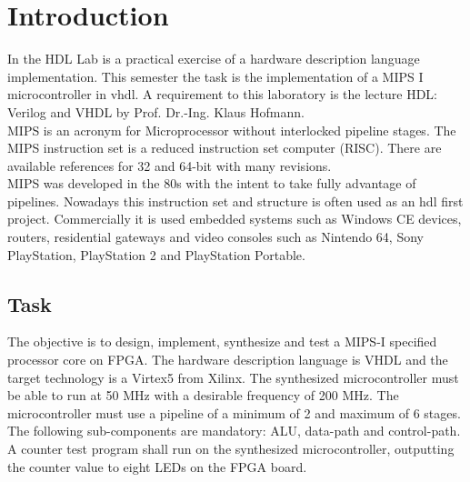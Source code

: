 \chapter{Introduction}
In the HDL Lab is a practical exercise of a hardware description language implementation. This semester the task is the implementation of a MIPS I microcontroller in vhdl. 
A requirement to this laboratory is the lecture HDL: Verilog and VHDL by Prof. Dr.-Ing. Klaus Hofmann.\\
MIPS is an acronym for Microprocessor without interlocked pipeline stages.
The MIPS instruction set is a reduced instruction set computer (RISC). There are available references for 32 and 64-bit with many revisions.\\
MIPS was developed in the 80s with the intent to take fully advantage of pipelines. Nowadays this instruction set and structure 
is often used as an hdl first project. Commercially it is used embedded systems such as Windows CE devices, routers, residential gateways and video
consoles such as Nintendo 64, Sony PlayStation, PlayStation 2 and PlayStation Portable. \\

\section{Task}

The objective is to design, implement, synthesize and test a MIPS-I specified processor core on FPGA. 
The hardware description language is VHDL and the target technology is a Virtex5 from Xilinx.
The synthesized microcontroller must be able to run at 50 MHz with a desirable frequency of 200 MHz. 
The microcontroller must use a pipeline of a minimum of 2 and maximum of 6 stages.
The following sub-components are mandatory: ALU, data-path and control-path.\\
A counter test program shall run on the synthesized microcontroller, outputting the counter value
to eight LEDs on the FPGA board.
